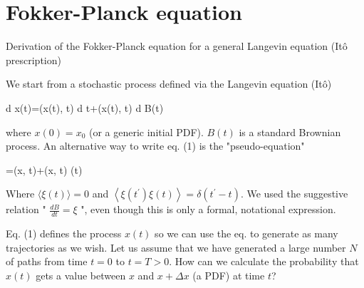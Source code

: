 
\section{Fokker-Planck equation}
Derivation of the Fokker-Planck equation for a general Langevin equation (Itô
prescription)

We start from a stochastic process defined via the Langevin equation (Itô)
\begin{DispWithArrows}[displaystyle, format=c]
  d x(t)=\mu(x(t), t) d t+\sigma(x(t), t) d B(t)
\end{DispWithArrows}
where $x(0)=x_{0}$ (or a generic initial PDF). $B(t)$ is a standard Brownian
process.
An alternative way to write eq. (1) is the "pseudo-equation"
\begin{DispWithArrows}[displaystyle, format=c]
  =\mu(x, t)+\sigma(x, t) \xi(t)
\end{DispWithArrows}
Where $\langle\xi(t)\rangle=0$ and
$\left\langle\xi\left(t^{\prime}\right) \xi(t)\right\rangle=\delta\left(t^{\prime}-t\right)$.
We used the suggestive relation " $\frac{d B}{d t}=\xi$ ", even though this is
only a formal, notational expression.

Eq. (1) defines the process $x(t)$ so we can use the eq. to generate as many
trajectories as we wish. Let us assume that we have generated a large number $N$
of paths from time $t=0$ to $t=T>0$. How can we calculate the probability that
$x(t)$ gets a value between $x$ and $x+\Delta x$ (a PDF) at time $t$?

